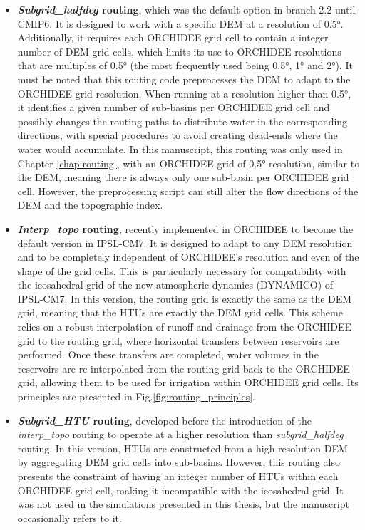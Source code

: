 \begin{itemize}
\item \textbf{\textit{Subgrid\_halfdeg} routing}, which was the default option in branch 2.2 until CMIP6. It is designed to work with a specific DEM at a resolution of 0.5°. Additionally, it requires each ORCHIDEE grid cell to contain a integer number of DEM grid cells, which limits its use to ORCHIDEE resolutions that are multiples of 0.5° (the most frequently used being 0.5°, 1° and 2°). It must be noted that this routing code preprocesses the DEM to adapt to the ORCHIDEE grid resolution. When running at a resolution higher than 0.5°, it identifies a given number of sub-basins per ORCHIDEE grid cell and possibly changes the routing paths to distribute water in the corresponding directions, with special procedures to avoid creating dead-ends where the water would accumulate. In this manuscript, this routing was only used in Chapter \ref{chap:routing},  with an ORCHIDEE grid of 0.5° resolution, similar to the DEM, meaning there is always only one sub-basin per ORCHIDEE grid cell. However, the preprocessing script can still alter the flow directions of the DEM and the topographic index. 

\item \textbf{\textit{Interp\_topo} routing}, recently implemented in ORCHIDEE to become the default version in IPSL-CM7. It is designed to adapt to any DEM resolution and to be completely independent of ORCHIDEE’s resolution and even of the shape of the grid cells. This is particularly necessary for compatibility with the icosahedral grid of the new atmospheric dynamics (DYNAMICO) of IPSL-CM7.
In this version, the routing grid is exactly the same as the DEM grid, meaning that the HTUs are exactly the DEM grid cells. This scheme relies on a robust interpolation %
of runoff and drainage from the ORCHIDEE grid to the routing grid, where horizontal transfers between reservoirs are performed. Once these transfers are completed, water volumes in the reservoirs are re-interpolated from the routing grid back to the ORCHIDEE grid, allowing them to be used for irrigation within ORCHIDEE grid cells. Its principles are presented in Fig.\ref{fig:routing_principles}.

\item \textbf{\textit{Subgrid\_HTU} routing}, developed before the introduction of the \textit{interp\_topo} routing to operate at a higher resolution than \textit{subgrid\_halfdeg} routing. In this version, HTUs are constructed from a high-resolution DEM by aggregating DEM grid cells into sub-basins. However, this routing  also presents the constraint of having an integer number of HTUs within each ORCHIDEE grid cell, making it incompatible with the icosahedral grid. It was not used in the simulations presented in this thesis, but the manuscript occasionally refers to it.
\end{itemize}


